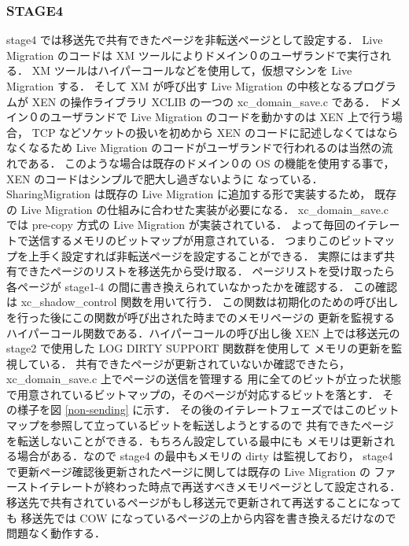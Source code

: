 \documentclass[graduation-thesis]{mlarticle}
\begin{document}
\subsubsection{STAGE4}
\label{sec-5-3-4}
stage4 では移送先で共有できたページを非転送ページとして設定する．
Live Migration のコードは XM ツールによりドメイン０のユーザランドで実行される．
XM ツールはハイパーコールなどを使用して，仮想マシンを Live Migration する．
そして XM が呼び出す Live Migration の中核となるプログラムが
XEN の操作ライブラリ XCLIB の一つの xc\_domain\_save.c である．
ドメイン０のユーザランドで Live Migration のコードを動かすのは XEN 上で行う場合，
TCP などソケットの扱いを初めから XEN のコードに記述しなくてはならなくなるため
Live Migration のコードがユーザランドで行われるのは当然の流れである．
このような場合は既存のドメイン０の OS の機能を使用する事で，XEN のコードはシンプルで肥大し過ぎないように
なっている．
SharingMigration は既存の Live Migration に追加する形で実装するため，
既存の Live Migration の仕組みに合わせた実装が必要になる．
xc\_domain\_save.c では pre-copy 方式の Live Migration が実装されている．
よって毎回のイテレートで送信するメモリのビットマップが用意されている．
つまりこのビットマップを上手く設定すれば非転送ページを設定することができる．
実際にはまず共有できたページのリストを移送先から受け取る．
ページリストを受け取ったら各ページが stage1-4 の間に書き換えられていなかったかを確認する．
この確認は xc\_shadow\_control 関数を用いて行う．
この関数は初期化のための呼び出しを行った後にこの関数が呼び出された時までのメモリページの
更新を監視するハイパーコール関数である．ハイパーコールの呼び出し後
XEN 上では移送元の stage2 で使用した LOG DIRTY SUPPORT 関数群を使用して
メモリの更新を監視している．
共有できたページが更新されていないか確認できたら，
xc\_domain\_save.c 上でページの送信を管理する
用に全てのビットが立った状態で用意されているビットマップの，そのページが対応するビットを落とす．
その様子を図 \ref{non-sending} に示す．
その後のイテレートフェーズではこのビットマップを参照して立っているビットを転送しようとするので
共有できたページを転送しないことができる．もちろん設定している最中にも
メモリは更新される場合がある．なので stage4 の最中もメモリの dirty は監視しており，
stage4 で更新ページ確認後更新されたページに関しては既存の Live Migration の
ファーストイテレートが終わった時点で再送すべきメモリページとして設定される．
移送先で共有されているページがもし移送元で更新されて再送することになっても
移送先では COW になっているページの上から内容を書き換えるだけなので問題なく動作する．
\end{document}
